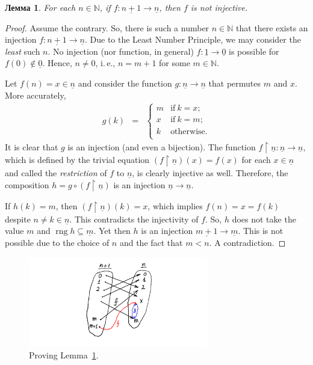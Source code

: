 \documentclass[12pt,notitlepage]{article}
\theoremstyle{plain}
\newtheorem{lemma}[thm]{Лемма}
\theoremstyle{definition}
\theoremstyle{plain}
\newcommand{\N}{\mathbb{N}}
\newcommand{\sbs}{\subseteq}
\newcommand{\rng}{\mathop{\mathrm{rng}}}
\newcommand{\rst}{\mathop{\upharpoonright}}
\newcommand{\ul}[1]{\underline{#1}}
\newcommand{\1}{\mathbf{1}}
\newcommand{\0}{\mathbf{0}}
\begin{document}
\begin{lemma}\label{L10:dirichlet_lemma}
	For each $n \in \N$, if $f\colon \ul{n+1} \to \ul{n}$, then $f$ is \emph{not} injective.
\end{lemma}
\begin{proof}
	Assume the contrary. So, there is such a number $n \in \N$ that there exists an injection $f\colon \ul{n+1} \to \ul{n}$. Due to the Least Number Principle, we may consider the \emph{least} such $n$. No injection (nor function, in general) $f\colon \ul{1} \to \ul{0}$ is possible for $f(0) \notin \ul{0}$. Hence, $n \neq 0$, i.\,e., $n = m + 1$ for some $m \in \N$.
	
	Let $f(n) = x \in \ul{n}$ and consider the function $g\colon \ul{n} \to \ul{n}$ that permutes $m$ and $x$. More accurately,
	$$
	\begin{array}{rcll}
		g(k) &=&\begin{cases}
			m&\mbox{if}\ k = x;\\
			x&\mbox{if}\ k = m;\\
			k& \mbox{otherwise}.\\
		\end{cases}
	\end{array}
	$$
	It is clear that $g$ is an injection (and even a bijection). The function $f\rst \ul{n}\colon \ul{n} \to \ul{n}$, which is defined by the trivial equation $(f\rst \ul{n})(x) = f(x)$ for each $x \in \ul{n}$ and called the \emph{restriction} of $f$ to $\ul{n}$, is clearly injective as well. Therefore, the composition $h = g \circ (f \rst \ul{n})$ is an injection $\ul{n} \to \ul{n}$.
	
	If $h(k) = m$, then $(f \rst \ul{n})(k) = x$, which implies  $f(n) = x = f(k)$ despite $n \neq k \in \ul{n}$. This contradicts the injectivity of $f$. So, $h$ does not take the value $m$ and $\rng h \sbs \ul{m}$. Yet then $h$ is an injection $\ul{m+1} \to \ul{m}$. This is not possible due to the choice of $n$ and the fact that $m < n$. A contradiction.
\end{proof}

\begin{figure}[h]
	\centering
	\includegraphics*[width=0.7\textwidth]{dirichlet.pdf}
	\caption{Proving Lemma~\ref{L10:dirichlet_lemma}.}
\end{figure}
\end{document}
